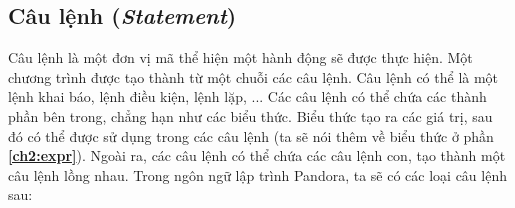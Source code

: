 \subsection{Câu lệnh (\textit{Statement})}

Câu lệnh là một đơn vị mã thể hiện một hành động sẽ được thực hiện. Một chương trình được tạo thành từ một chuỗi các câu lệnh. Câu lệnh có thể là một lệnh khai báo, lệnh điều kiện, lệnh lặp, ... Các câu lệnh có thể chứa các thành phần bên trong, chẳng hạn như các biểu thức. Biểu thức tạo ra các giá trị, sau đó có thể được sử dụng trong các câu lệnh (ta sẽ nói thêm về biểu thức ở phần \textbf{\ref{ch2:expr}}). Ngoài ra, các câu lệnh có thể chứa các câu lệnh con, tạo thành một câu lệnh lồng nhau. Trong ngôn ngữ lập trình Pandora, ta sẽ có các loại câu lệnh sau:

\regexstmt







